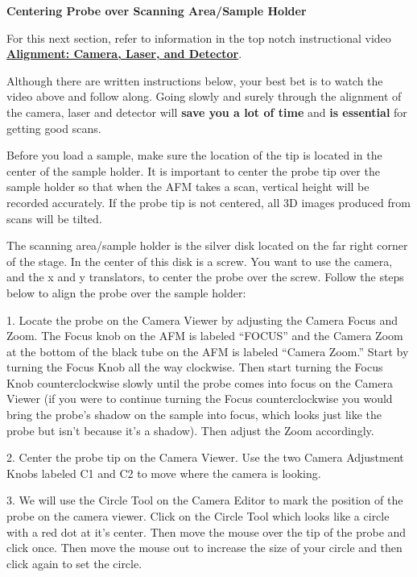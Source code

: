 \documentclass{../lab}
\begin{document}
\textbf{Centering Probe over Scanning Area/Sample Holder}

For this next section, refer to information in the top notch instructional video  \href{http://experimentationlab.berkeley.edu/sites/default/files/alignment\_final2.mp4}{\textbf{Alignment: Camera, Laser, and Detector}}.

Although there are written instructions below, your best bet is to watch the video above and follow along. Going slowly and surely through the alignment of the camera, laser and detector will \textbf{save you a lot of time} and \textbf{is essential} for getting good scans.

Before you load a sample, make sure the location of the tip is located in the center of the sample holder.  It is important to center the probe tip over the sample holder so that when the AFM takes a scan, vertical height will be recorded accurately.  If the probe tip is not centered, all 3D images produced from scans will be tilted.

The scanning area/sample holder is the silver disk located on the far right corner of the stage.  In the center of this disk is a screw.  You want to use the camera, and the x and y translators, to center the probe over the screw.  Follow the steps below to align the probe over the sample holder:

1.  Locate the probe on the Camera Viewer by adjusting the Camera Focus and Zoom.  The Focus knob on the AFM is labeled ``FOCUS'' and the Camera Zoom at the bottom of the black tube on the AFM is labeled ``Camera Zoom.''  Start by turning the Focus Knob all the way clockwise.  Then start turning the Focus Knob counterclockwise slowly until the probe comes into focus on the Camera Viewer (if you were to continue turning the Focus counterclockwise you would bring the probe's shadow on the sample into focus, which looks just like the probe but isn't because it's a shadow).  Then adjust the Zoom accordingly.

2.  Center the probe tip on the Camera Viewer.  Use the two Camera Adjustment Knobs labeled C1 and C2 to move where the camera is looking.

3.  We will use the Circle Tool on the Camera Editor to mark the position of the probe on the camera viewer. Click on the Circle Tool which looks like a circle with a red dot at it's center. Then move the mouse over the tip of the probe and click once.  Then move the mouse out to increase the size of your circle and then click again to set the circle.
\end{document}
